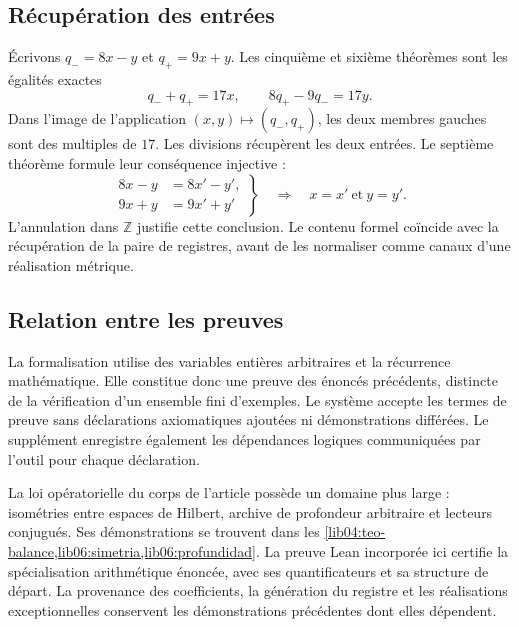 \subsection*{Récupération des entrées}

Écrivons \(q_-=8x-y\) et \(q_+=9x+y\). Les cinquième et sixième théorèmes
sont les égalités exactes
\[
 q_-+q_+=17x,\qquad 8q_+-9q_-=17y.
\]
Dans l’image de l’application \((x,y)\mapsto(q_-,q_+)\), les deux membres
gauches sont des multiples de \(17\). Les divisions récupèrent les deux
entrées. Le septième théorème formule leur conséquence injective :
\[
 \left.
 \begin{aligned}
 8x-y&=8x'-y',\\
 9x+y&=9x'+y'
 \end{aligned}
 \right\}
 \quad\Longrightarrow\quad x=x'\ \text{et}\ y=y'.
\]
L’annulation dans \(\mathbb Z\) justifie cette conclusion. Le contenu
formel coïncide avec la récupération de la paire de registres, avant de
les normaliser comme canaux d’une réalisation métrique.

\subsection*{Relation entre les preuves}

La formalisation utilise des variables entières arbitraires et la récurrence mathématique. Elle constitue donc une preuve des énoncés précédents, distincte de la vérification d'un ensemble fini d'exemples. Le système accepte les termes de preuve sans déclarations axiomatiques ajoutées ni démonstrations différées. Le supplément enregistre également les dépendances logiques communiquées par l'outil pour chaque déclaration.

La loi opératorielle du corps de l’article possède un domaine plus large :
isométries entre espaces de Hilbert, archive de profondeur arbitraire et
lecteurs conjugués. Ses démonstrations se trouvent dans les
\cref{lib04:teo-balance,lib06:simetria,lib06:profundidad}. La preuve Lean
incorporée ici certifie la spécialisation arithmétique énoncée, avec
ses quantificateurs et sa structure de départ. La provenance des
coefficients, la génération du registre et les réalisations exceptionnelles
conservent les démonstrations précédentes dont elles dépendent.
